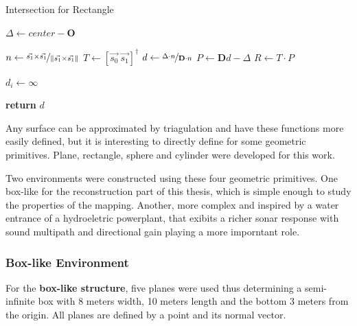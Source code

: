 \begin{algorithm}
\caption{Intersection for Rectangle}
\label{alg:rectangle}
\begin{algorithmic}

\State $\Delta \gets center -
\mathbf{O}$ 

\State $n \gets \nicefrac{\vec{s_1} \times  \vec{s_1}}{\left\lVert\vec{s_1} \times  \vec{s_1}\right\rVert}$
\State $T \gets \left[ \vec{s_0} ~ \vec{s_1} \right]^\dagger$
\State $d \gets \nicefrac{\Delta \cdot n}{\mathbf{D} \cdot n}$
\State $P \gets \mathbf{D}d - \Delta$
\State $R \gets T \cdot P$

\ForAll{$i \in \left[0,\ldots,\text{size}(d)\right)$}
\State $d_i \gets \infty$
\EndIf  
\EndFor


\State \textbf{return} $d$

\EndFunction
\end{algorithmic}
\end{algorithm}

Any surface can be approximated by triagulation and have these functions more
easily defined, but it is interesting to directly define for some geometric
primitives. Plane, rectangle, sphere and cylinder were developed for this work.

Two environments were constructed using these four geometric primitives. One
box-like for the reconstruction part of this thesis, which is simple enough to
study the properties of the mapping. Another, more complex and inspired by a
water entrance of a hydroeletric powerplant, that exibits a richer sonar
response with sound multipath and directional gain playing a more imporntant
role.
\subsubsection{Box-like Environment}
\label{eq:boxlikenv}
For the \textbf{box-like structure}, five planes were used thus determining a
semi-infinite box with 8 meters width, 10 meters length and the bottom 3 meters
from the origin. All planes are defined by a point and its normal vector.

